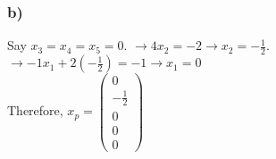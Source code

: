 \documentclass[fleqn]{article}
\begin{document}
\subsubsection*{b)}
Say $x_3=x_4=x_5=0$.  $\rightarrow 4x_2=-2 \rightarrow x_2 = -\frac{1}{2}$.  $\rightarrow -1x_1 +2(-\frac{1}{2})=-1 \rightarrow x_1 = 0$\\
Therefore, $x_p = \begin{pmatrix}0\\-\frac{1}{2}\\0\\0\\0\end{pmatrix}$
\end{document}
